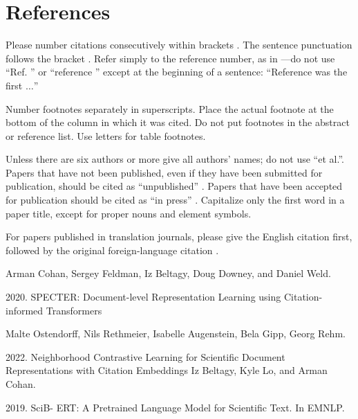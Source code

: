 \documentclass[conference]{IEEEtran}
\begin{document}
\section*{References}

Please number citations consecutively within brackets . The 
sentence punctuation follows the bracket \cite{b2}. Refer simply to the reference 
number, as in \cite{b3}---do not use ``Ref. \cite{b3}'' or ``reference \cite{b3}'' except at 
the beginning of a sentence: ``Reference \cite{b3} was the first $\ldots$''

Number footnotes separately in superscripts. Place the actual footnote at 
the bottom of the column in which it was cited. Do not put footnotes in the 
abstract or reference list. Use letters for table footnotes.

Unless there are six authors or more give all authors' names; do not use 
``et al.''. Papers that have not been published, even if they have been 
submitted for publication, should be cited as ``unpublished'' \cite{b4}. Papers 
that have been accepted for publication should be cited as ``in press'' \cite{b5}. 
Capitalize only the first word in a paper title, except for proper nouns and 
element symbols.

For papers published in translation journals, please give the English 
citation first, followed by the original foreign-language citation \cite{b6}.

\begin{thebibliography}{00}
Arman Cohan, Sergey Feldman, Iz Beltagy, Doug Downey, and Daniel Weld. 

2020. SPECTER: Document-level Representation Learning using Citation-informed Transformers

 Malte Ostendorff, Nils Rethmeier, Isabelle Augenstein, Bela Gipp, Georg Rehm.

2022. Neighborhood Contrastive Learning for Scientific Document Representations with Citation Embeddings
 Iz Beltagy, Kyle Lo, and Arman Cohan.

2019. SciB- ERT: A Pretrained Language Model for Scientific Text. In EMNLP.

\end{thebibliography}
\vspace{12pt}
\end{document}
